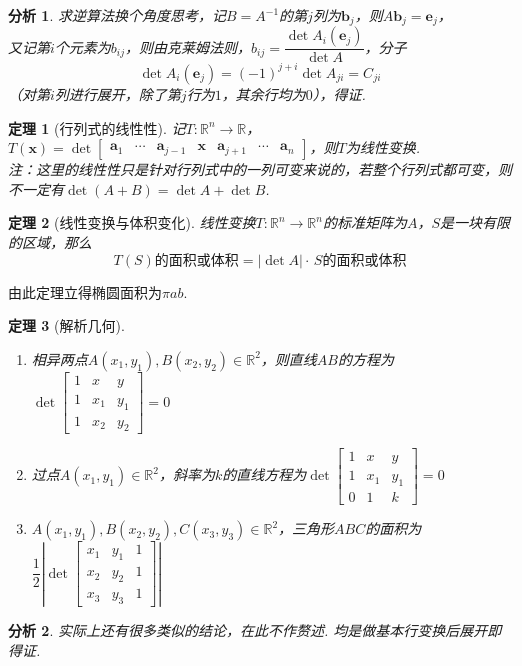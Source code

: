 \documentclass[11pt,UTF8]{ctexart}
\newtheorem{theorem}{定理}
\newtheorem*{analysis}{分析}
\def\vx{\mathbf{x}}
\def\rn{\mathbb{R}^n}
\newcommand{\vb}[1]{\mathbf{#1}}
\begin{document}
\begin{analysis}求逆算法换个角度思考，记$B=A^{-1}$的第$j$列为$\vb{b}_j$，则$A\vb{b}_j=\vb{e}_j$，\\
又记第$i$个元素为$b_{ij}$，则由克莱姆法则，$b_{ij}=\dfrac{\det A_i(\vb{e}_j)}{\det A}$，分子
\[\det A_i(\vb{e}_j)=(-1)^{j+i}\det A_{ji}=C_{ji}\]
（对第$i$列进行展开，除了第$j$行为$1$，其余行均为$0$），得证.
\end{analysis}
\begin{theorem}[行列式的线性性]
记$T:\rn\to\mathbb{R}$，$T(\vx)=\det\begin{bmatrix}\vb{a}_1&\cdots&\vb{a}_{j-1}&\vx&\vb{a}_{j+1}&\cdots&\vb{a}_n\end{bmatrix}$，则$T$为线性变换.\\
注：这里的线性性只是针对行列式中的一列可变来说的，若整个行列式都可变，则不一定有$\det (A+B)=\det A+\det B$.
\end{theorem}
\begin{theorem}[线性变换与体积变化]
线性变换$T:\rn\to\rn$的标准矩阵为$A$，$S$是一块有限的区域，那么
\[T(S)\text{的面积或体积}=|\det A|\cdot\,S\text{的面积或体积}\]
\end{theorem}
由此定理立得椭圆面积为$\pi a b$.
\begin{theorem}[解析几何]
\begin{enumerate}
	\item 相异两点$A(x_1,y_1),B(x_2,y_2)\in\mathbb{R}^2$，则直线$AB$的方程为$\det\begin{bmatrix}1&x&y\\1&x_1&y_1\\1&x_2&y_2\end{bmatrix}=0$
	\item 过点$A(x_1,y_1)\in\mathbb{R}^2$，斜率为$k$的直线方程为$\det\begin{bmatrix}1&x&y\\1&x_1&y_1\\0&1&k\end{bmatrix}=0$
	\item $A(x_1,y_1),B(x_2,y_2),C(x_3,y_3)\in\mathbb{R}^2$，三角形$ABC$的面积为$\dfrac{1}{2}\left|\det\begin{bmatrix}x_1&y_1&1\\x_2&y_2&1\\x_3&y_3&1\end{bmatrix}\right|$
\end{enumerate}
\end{theorem}
\begin{analysis}
实际上还有很多类似的结论，在此不作赘述. 均是做基本行变换后展开即得证.
\end{analysis}
\end{document}
